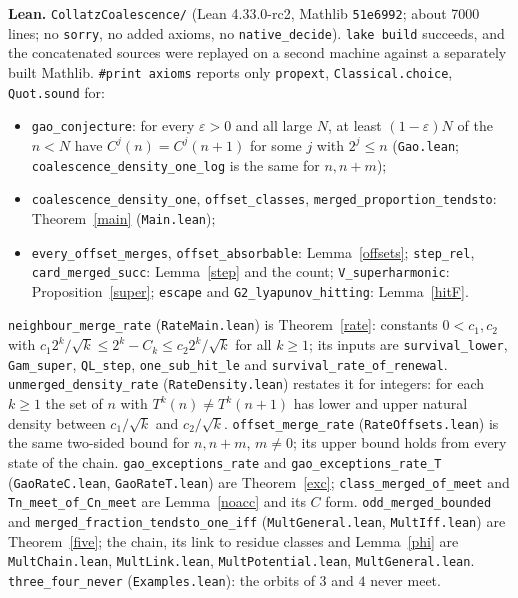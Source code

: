 \documentclass[11pt]{article}
\theoremstyle{remark}
\begin{document}
\medskip\noindent\textbf{Lean.} \texttt{CollatzCoalescence/} (Lean 4.33.0-rc2, Mathlib
\texttt{51e6992}; about 7000 lines; no \texttt{sorry}, no added axioms, no \texttt{native\_decide}).
\texttt{lake build} succeeds, and the concatenated sources were replayed on a second machine
against a separately built Mathlib. \texttt{\#print axioms} reports only \texttt{propext},
\texttt{Classical.choice}, \texttt{Quot.sound} for:
\begin{itemize}\itemsep0pt
\item \texttt{gao\_conjecture}: for every $\varepsilon>0$ and all large $N$, at least
$(1-\varepsilon)N$ of the $n<N$ have $C^{j}(n)=C^{j}(n+1)$ for some $j$ with $2^j\le n$
(\texttt{Gao.lean}; \texttt{coalescence\_density\_one\_log} is the same for $n,n+m$);
\item \texttt{coalescence\_density\_one}, \texttt{offset\_classes},
\texttt{merged\_proportion\_tendsto}: Theorem~\ref{main} (\texttt{Main.lean});
\item \texttt{every\_offset\_merges}, \texttt{offset\_absorbable}: Lemma~\ref{offsets};
\texttt{step\_rel}, \texttt{card\_merged\_succ}: Lemma~\ref{step} and the count;
\texttt{V\_superharmonic}: Proposition~\ref{super}; \texttt{escape} and
\texttt{G2\_lyapunov\_hitting}: Lemma~\ref{hitF}.
\end{itemize}
\texttt{neighbour\_merge\_rate} (\texttt{RateMain.lean}) is Theorem~\ref{rate}: constants
$0<c_1,c_2$ with $c_1 2^k/\sqrt k\le 2^k-C_k\le c_2 2^k/\sqrt k$ for all $k\ge1$; its inputs are
\texttt{survival\_lower}, \texttt{Gam\_super}, \texttt{QL\_step}, \texttt{one\_sub\_hit\_le} and
\texttt{survival\_rate\_of\_renewal}. \texttt{unmerged\_density\_rate} (\texttt{RateDensity.lean})
restates it for integers: for each $k\ge1$ the set of $n$ with $T^k(n)\ne T^k(n+1)$ has lower and
upper natural density between $c_1/\sqrt k$ and $c_2/\sqrt k$. \texttt{offset\_merge\_rate} (\texttt{RateOffsets.lean}) is the
same two-sided bound for $n,n+m$, $m\ne0$; its upper bound holds from every state of the chain.
\texttt{gao\_exceptions\_rate} and \texttt{gao\_exceptions\_rate\_T} (\texttt{GaoRateC.lean},
\texttt{GaoRateT.lean}) are Theorem~\ref{exc}; \texttt{class\_merged\_of\_meet} and
\texttt{Tn\_meet\_of\_Cn\_meet} are Lemma~\ref{noacc} and its $C$ form.
\texttt{odd\_merged\_bounded} and \texttt{merged\_fraction\_tendsto\_one\_iff}
(\texttt{MultGeneral.lean}, \texttt{MultIff.lean}) are Theorem~\ref{five}; the chain, its link to
residue classes and Lemma~\ref{phi} are \texttt{MultChain.lean}, \texttt{MultLink.lean},
\texttt{MultPotential.lean}, \texttt{MultGeneral.lean}. \texttt{three\_four\_never} (\texttt{Examples.lean}): the orbits of $3$
and $4$ never meet.
\end{document}

